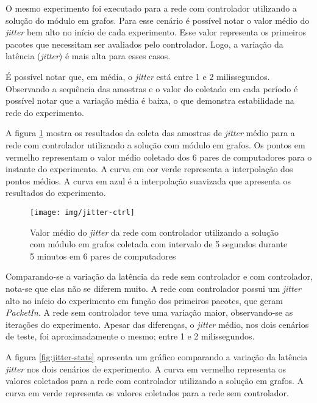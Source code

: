 O mesmo experimento foi executado para a rede com controlador utilizando a 
solução do módulo em grafos.
Para esse cenário é possível notar o valor médio do \emph{jitter} bem alto
no início de cada experimento.
Esse valor representa os primeiros pacotes que necessitam ser avaliados pelo
controlador. 
Logo, a variação da latência (\emph{jitter}) é mais alta para esses casos.

É possível notar que, em média, o \emph{jitter} está entre 1 e 2 milissegundos.
Observando a sequência das amostras e o valor do coletado em cada período é 
possível notar que a variação média é baixa, o que demonstra estabilidade na
rede do experimento.

A figura \ref{fig:jitter-ctrl} mostra os resultados da coleta das amostras 
de \emph{jitter} médio para a rede com controlador utilizando a solução com 
módulo em grafos.
Os pontos em vermelho representam o valor médio coletado dos 6 pares de 
computadores para o instante do experimento.
A curva em cor verde representa a interpolação dos pontos médios.
A curva em azul é a interpolação suavizada que apresenta os resultados do 
experimento. 

\break

\begin{figure}[!htb]
    \centering
    \label{fig:jitter-ctrl}
    \texttt{[image: img/jitter-ctrl]}
    \caption{Valor médio do \emph{jitter} da rede com controlador utilizando a
    solução com módulo em grafos coletada com intervalo de 5 segundos durante 5
    minutos em 6 pares de computadores}
\end{figure}

Comparando-se a variação da latência da rede sem controlador e com controlador,
nota-se que elas não se diferem muito.
A rede com controlador possui um \emph{jitter} alto no início do experimento
em função dos primeiros pacotes, que geram \emph{PacketIn}.
A rede sem controlador teve uma variação maior, observando-se as iterações 
do experimento.
Apesar das diferenças, o \emph{jitter} médio, nos dois cenários de teste, 
foi aproximadamente o mesmo; entre 1 e 2 milissegundos.

A figura \ref{fig:jitter-stats} apresenta um gráfico comparando a variação da 
latência \emph{jitter} nos dois cenários de experimento.
A curva em vermelho representa os valores coletados para a rede com controlador
utilizando a solução em grafos.
A curva em verde representa os valores coletados para a rede sem controlador.

\break

